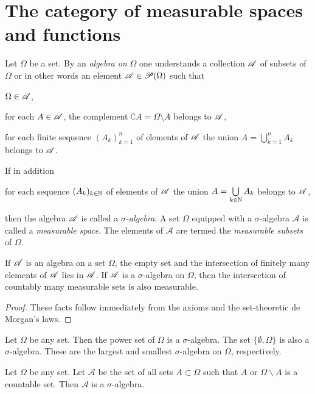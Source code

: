
\section{The category of measurable spaces and functions}\label{sec:category-measurable-spaces-functions}
\begin{definition}
  Let $\Omega$ be a set. By an \emph{algebra on} $\Omega$ one understands a collection $\mathscr{A}$ of subsets of $\Omega$
  or in other words an element $\mathscr{A}\in \mathscr{P}(\Omega)$ such that
  \begin{axiomlist}[A]
  \item $\Omega \in \mathscr{A}$,
  \item for each $A\in \mathscr{A}$, the complement $\complement A = \Omega \setminus A $ belongs to $\mathscr{A}$,
  \item for each finite sequence $(A_k)_{k=1}^n$ of elements of $\mathscr{A}$ the union $A= \bigcup\limits_{k=1}^n A_k$
        belongs to $\mathscr{A}$. 
  \end{axiomlist}
  If in addition 
  \begin{axiomlist}[A]
  \setcounter{enumi}{3}
  \item for each sequence $(A_k)_{k\in \mathbb{N}}$ of elements of $\mathscr{A}$ the union $A= \bigcup\limits_{k\in\mathbb{N}} A_k$
        belongs to $\mathscr{A}$,
  \end{axiomlist}
  then the algebra $\mathscr{A}$ is called a \emph{$\sigma$-algebra}.
  A set $\Omega$ equipped with a $\sigma$-algebra $\mathscr A$ is called a 
  \emph{measurable space}.  The elements of $\mathscr A$ are termed the 
  \emph{measurable subsets} of $\Omega$.
\end{definition}

\begin{proposition}
  If $\mathscr{A}$ is an algebra on a set $\Omega$, the empty set and the intersection of finitely many
  elements of $\mathscr{A}$ lies in $\mathscr{A}$.
  If $\mathscr{A}$ is a $\sigma$-algebra on $\Omega$, then the intersection of countably many
  measurable sets is also measurable.
\end{proposition}
\begin{proof}
  These facts follow immediately from the axioms and the set-theoretic de Morgan's laws. 
\end{proof}

\begin{examples}
\begin{environmentlist}
\item Let $\Omega$ be any set. Then the power set of $\Omega$ is a $\sigma$-algebra.  
  The set $\{ \emptyset , \Omega \}$ is also a $\sigma$-algebra. These are the  largest and smallest
  $\sigma$-algebra on $\Omega$, respectively. 
\item
  Let $\Omega$ be any set.  Let $\mathscr A$ be the set of all sets $A\subset \Omega$ such that $A$ or $\Omega \backslash A$ is
  a countable set.  Then $\mathscr A$ is a $\sigma$-algebra.
\end{environmentlist}
\end{examples}

